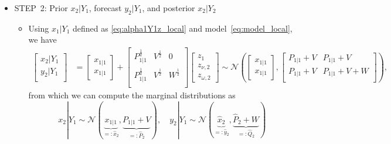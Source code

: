 \documentclass[12pt,a4paper]{article}
\begin{document}
\begin{itemize}
\begin{itemize}
  \item STEP~2: Prior $x_{2}|Y_{1}$, forecast $y_{2}|Y_{1}$, and posterior $x_{2}|Y_{2}$

    \begin{itemize}

    \item Using $x_{1}|Y_{1}$ defined as \eqref{eq:alpha1Y1z_local} and model~\eqref{eq:model_local},
      we have
      \begin{align}
        \begin{bmatrix}
          x_{2}|Y_{1}\\
          y_{2}|Y_{1}\\
        \end{bmatrix}
        & =
          \begin{bmatrix}
            x_{1|1}\\
            x_{1|1}
          \end{bmatrix}
          +
          \begin{bmatrix}
            P_{1|1}^{\frac{1}{2}} & V^{\frac{1}{2}} & 0\\
            P_{1|1}^{\frac{1}{2}} & V^{\frac{1}{2}} & W^{\frac{1}{2}}\\
          \end{bmatrix}
          \begin{bmatrix}
            z_{1}\\
            z_{\nu,2} \\
            z_{\omega,2}
          \end{bmatrix}
          \sim \mathcal{N}
          \left(
          \begin{bmatrix}
            x_{1|1}\\
            x_{1|1}
          \end{bmatrix}
          ,
          \begin{bmatrix}
            P_{1|1} + V & P_{1|1} + V\\
            P_{1|1} + V & P_{1|1}+ V + W\\
          \end{bmatrix}
          \right),
          \label{eq:alpha2y2Y1_local}%
      \end{align}
      from which we can compute the marginal distributions as
      \begin{equation}\label{eq:a2P2_local}%
        x_{2}|Y_{1} \sim \mathcal{N} (\underbrace{x_{1|1}}_{=:\hat{x}_{2}},\underbrace{P_{1|1} + V}_{=:\hat{P}_{2}}),
        \quad
        y_{2}|Y_{1} \sim \mathcal{N} (\underbrace{\hat{x}_{2}}_{=:\hat{y}_{2}},\underbrace{\hat{P}_{2} + W}_{=:\hat{Q}_{2}})
      \end{equation}


\end{itemize}
\end{itemize}
\end{itemize}
\end{document}
